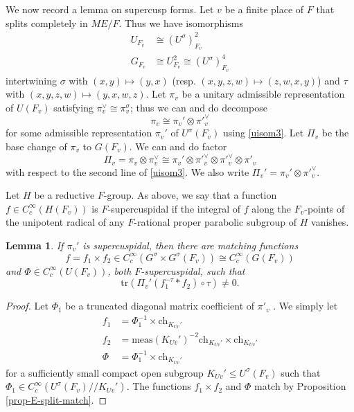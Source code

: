 \documentclass[12pt]{amsart}
\newtheorem{lem}[thm]{Lemma}
\theoremstyle{remark}
\numberwithin{equation}{section}
\theoremstyle{definition}
\numberwithin{equation}{subsection}
\begin{document}
We now record a lemma on supercusp forms.  Let $v$ be a finite
place of $F$ that splits completely in $ME/F$.  Thus we have isomorphisms
\begin{align} \label{uisom3}
U_{F_v} &\cong (U^{\sigma})^2_{F_v}\\
\nonumber G_{F_v} &\cong U_{F_v}^2 \cong (U^{\sigma})^4_{F_v}
\end{align}
intertwining $\sigma$ with $(x,y) \mapsto (y,x)$ (resp. $(x,y,z,w) \mapsto
(z,w,x,y)$) and $\tau$ with $(x,y,z,w) \mapsto (y,x,w,z)$.
Let $\pi_v$ be a unitary
admissible representation of $U(F_v)$ satisfying $\pi_v^{\vee} \cong
\pi_v^{\sigma}$; thus we can and do decompose
$$
\pi_v \cong \pi_v' \otimes \pi'^{\vee}_v
$$
for some admissible representation $\pi_v'$ of $U^{\sigma}(F_v)$ using
\eqref{uisom3}. Let $\Pi_v$ be the base change of $\pi_v$ to
$G(F_v)$. We can and do factor
$$
\Pi_v=\pi_v \otimes \pi_v^{\vee} \cong \pi_{v}' \otimes \pi'^{\vee}_v
\otimes \pi'^{\vee}_v \otimes \pi'_v
$$
with respect to the second line of \eqref{uisom3}.  We also write $\Pi_v'=\pi_v'
\otimes \pi'^{\vee}_v$.

Let $H$ be a reductive $F$-group.  As above, we say that a function $f \in C^{\infty}_c(H(F_v))$ is
$F$-supercuspidal if the integral of $f$ along the $F_v$-points of the unipotent radical of any $F$-rational proper parabolic subgroup of $H$ vanishes.

\begin{lem} \label{lem-supercusp} If $\pi_v'$ is supercuspidal, then
there are matching functions
$$
f=f_1 \times f_2 \in
C_c^{\infty}(G^{\sigma} \times G^{\sigma}(F_v)) \cong C_c^{\infty}(G(F_v))
$$
and $\Phi \in
C_c^{\infty}(U(F_v))$, both $F$-supercuspidal, such that
$$
\mathrm{tr}\left( \Pi_v'(f_1^{-\tau}*f_2) \circ \tau \right) \neq 0.
$$
\end{lem}

\begin{proof}
Let $\Phi_{1}$ be a truncated diagonal matrix coefficient of $\pi'_v$ \cite[\S 1.9]{HarLab}.  We simply
let
\begin{align*}
f_1&=\Phi_1^{-1} \times \mathrm{ch}_{K_{Uv}'} \\
f_2&=\mathrm{meas}(K_{Uv}')^{-2}\mathrm{ch}_{K_{Uv}'} \times \mathrm{ch}_{K_{Uv}'}\\
\Phi&=\Phi_1^{-1} \times \mathrm{ch}_{K_{Uv}'}
\end{align*}
for a sufficiently small compact open subgroup $K_{Uv}' \leq U^{\sigma}(F_v)$ such that $\Phi_1 \in C_c^{\infty}(U^{\sigma}(F_v)//K_{Uv}')$.  The functions $f_1 \times f_2$ and $\Phi$ match by Proposition \ref{prop-E-split-match}.
\end{proof}
\end{document}
